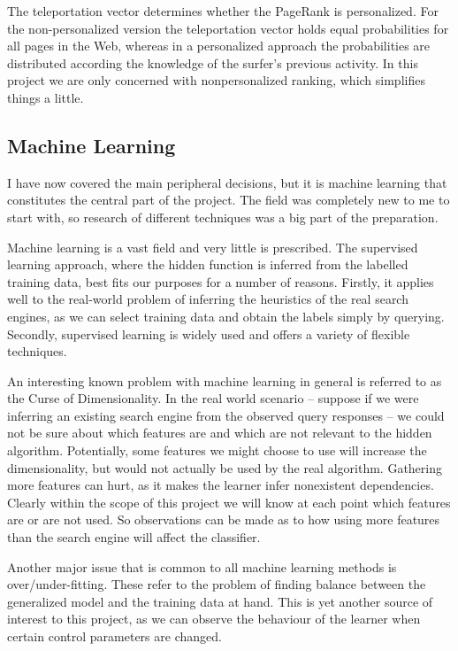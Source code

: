 \documentclass[11pt,twoside,notitlepage]{report}
\begin{document}
The teleportation vector determines whether the PageRank is personalized. For
the non-personalized version the teleportation vector holds equal probabilities
for all pages in the Web, whereas in a personalized approach the probabilities
are distributed according the knowledge of the surfer's previous activity. In
this project we are only concerned with nonpersonalized ranking, which
simplifies things a little.

\subsection{Machine Learning}

I have now covered the main peripheral decisions, but it is machine learning that
constitutes the central part of the project. The field was completely new to me
to start with, so research of different techniques was a big part of the
preparation.

Machine learning is a vast field and very little is prescribed.
The supervised learning approach, where the hidden function is
inferred from the labelled training data, best fits our purposes for a number
of reasons. Firstly, it applies well to the real-world problem of inferring the
heuristics of the real search engines, as we can select training data and
obtain the labels simply by querying. Secondly, supervised learning is widely
used and offers a variety of flexible techniques.

An interesting known problem with machine learning in general is referred to as
the Curse of Dimensionality. In the real world scenario -- suppose if we were
inferring an existing search engine from the observed query responses -- we
could not be sure about which features are and which are not relevant to the
hidden algorithm. Potentially, some features we might choose to use will
increase the dimensionality, but would not actually be used by the real
algorithm. Gathering more features can hurt, as it makes the learner infer
nonexistent dependencies. Clearly within the scope of this project we will know
at each point which features are or are not used. So observations can be made
as to how using more features than the search engine will affect the
classifier.

Another major issue that is common to all machine learning methods is
over/under-fitting. These refer to the problem of finding balance between the
generalized model and the training data at hand. This is yet another source of
interest to this project, as we can observe the behaviour of the learner when
certain control parameters are changed.
\end{document}
